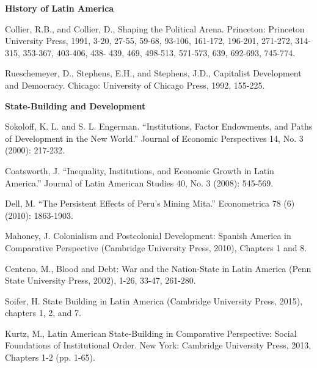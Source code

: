 \documentclass[letterpaper]{article}
\renewenvironment{itemize}{
  \begin{list}{}{
    \setlength{\leftmargin}{1.5em}
  }
}{
  \end{list}
}
\begin{document}
\begin{enumerate}

\item {\bf History of Latin America}
	\begin{itemize}
		\item[$\bullet$] Collier, R.B., and Collier, D., Shaping the Political Arena. Princeton: Princeton University Press, 1991, 3-20, 27-55, 59-68, 93-106, 161-172, 196-201, 271-272, 314-315, 353-367, 403-406, 438- 439, 469, 498-513, 571-573, 639, 692-693, 745-774.
		\item[$\bullet$] Rueschemeyer, D., Stephens, E.H., and Stephens, J.D., Capitalist Development and Democracy. Chicago: University of Chicago Press, 1992, 155-225.
	\end{itemize}



\item {\bf State-Building and Development}
	\begin{itemize}
		\item[$\bullet$] Sokoloff, K. L. and S. L. Engerman. ``Institutions, Factor Endowments, and Paths of Development in the New World.'' Journal of Economic Perspectives 14, No. 3 (2000): 217-232.
		\item[$\bullet$] Coatsworth, J. ``Inequality, Institutions, and Economic Growth in Latin America.'' Journal of Latin American Studies 40, No. 3 (2008): 545-569.
		\item[$\bullet$] Dell, M. ``The Persistent Effects of Peru's Mining Mita.'' Econometrica 78 (6) (2010): 1863-1903.
		\item[$\bullet$] Mahoney, J. Colonialism and Postcolonial Development: Spanish America in Comparative Perspective (Cambridge University Press, 2010), Chapters 1 and 8.
		\item[$\bullet$] Centeno, M., Blood and Debt: War and the Nation-State in Latin America (Penn State University Press, 2002), 1-26, 33-47, 261-280.
		\item[$\bullet$] Soifer, H. State Building in Latin America (Cambridge University Press, 2015), chapters 1, 2, and 7.
		\item[$\bullet$] Kurtz, M., Latin American State-Building in Comparative Perspective: Social Foundations of Institutional Order. New York: Cambridge University Press, 2013, Chapters 1-2 (pp. 1-65).
	\end{itemize}



\end{enumerate}
\end{document}
